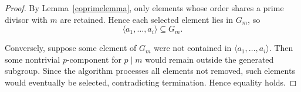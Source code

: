 \documentclass[10pt,a4paper]{amsart}
\begin{document}
	\begin{proof}
		By Lemma~\ref{coprimelemma}, only elements whose order shares a prime divisor with $m$ are retained. Hence each selected element lies in $G_m$, so
		\[
		\langle a_1,\dots,a_i\rangle \subseteq G_m.
		\]
		
		Conversely, suppose some element of $G_m$ were not contained in $\langle a_1,\dots,a_i\rangle$. Then some nontrivial $p$-component for $p \mid m$ would remain outside the generated subgroup. Since the algorithm processes all elements not removed, such elements would eventually be selected, contradicting termination. Hence equality holds.
	\end{proof}
\end{document}
